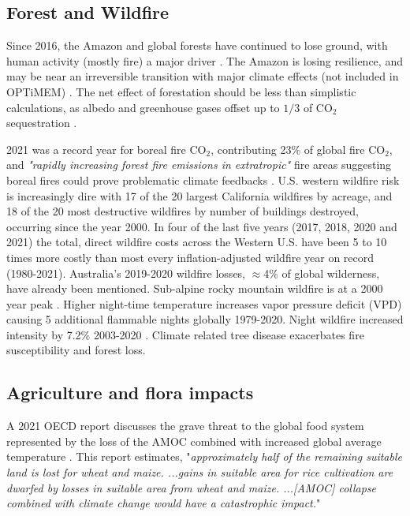 \documentclass{article}
\begin{document}
 \subsection{Forest and Wildfire}
 \label{lb:ForestAndWildfire}
 Since 2016, the Amazon and global forests have continued to lose ground, with human activity (mostly fire) a major driver \cite{NASA2022UptickAmazonFire,Gatti2021Amazonia_as_a_carbon_source,GlobalForest2022}. The Amazon is losing resilience, and may be near an irreversible transition with major climate effects (not included in OPTiMEM) \cite{Boulton2022Amazonresilience}. The net effect of forestation should be less than simplistic calculations, as albedo and greenhouse gases offset up to $1/3$ of CO$_2$ sequestration \cite{Weber2024FeedbacksOffsetOnethirdForestationCO2removal}. 
 
 2021 was a record year for boreal fire CO$_2$, contributing 23\% of global fire CO$_2$, and \emph{"rapidly increasing forest fire emissions in extratropic"} fire areas suggesting boreal fires could prove problematic climate feedbacks \cite{Zheng2023RecorodBorealCO2,Jones2024GlobalRiseInForestFire_ClimateChangeInExtratropics,Balch2024Fastest_most_destructive_fires2001to2020}.  U.S. western wildfire risk is increasingly dire with 17 of the 20 largest California wildfires by acreage, and 18 of the 20 most destructive wildfires by number of buildings destroyed, occurring since the year 2000.
In four of the last five years (2017, 2018, 2020 and 2021) the total, direct wildfire costs across the Western U.S. have been 5 to 10 times more costly than most every inflation-adjusted wildfire year on record (1980-2021). Australia's 2019-2020 wildfire losses, $\approx$4\% of global wilderness, have already been mentioned. Sub-alpine rocky mountain wildfire is at a 2000 year peak \cite{Higuerae2021ForestsBurnGT2000yr}. Higher night-time temperature increases vapor pressure deficit (VPD) causing 5 additional flammable nights globally 1979-2020. Night wildfire increased intensity by 7.2\% 2003-2020 \cite{Balch2022Warming-night-time-fir}.  Climate related tree disease \cite{Juroszek202030yrReviewClimateCrop,REED2022Beechdisease,Ewing2020BeechDisease} exacerbates fire susceptibility and forest loss. 
 
 \subsection{Agriculture and flora impacts}
A 2021 OECD report discusses the grave threat to the global food system represented by the loss of the AMOC combined with increased global average temperature \cite[p. 152]{OECD2021ManagingClimateRisksDamages}. This report estimates, "\emph{approximately half of the remaining suitable land is lost for wheat and maize. ...gains in suitable area for rice cultivation are dwarfed by losses in suitable area from wheat and maize. ...[AMOC] collapse combined with climate change would have a catastrophic impact.}"
\end{document}
